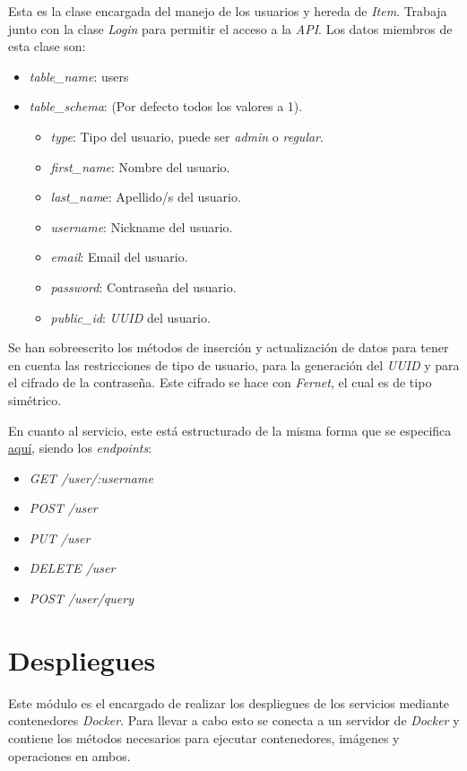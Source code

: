 Esta es la clase encargada del manejo de los usuarios y hereda de \textit{Item}. Trabaja junto con la clase \textit{Login} para permitir el acceso a la \textit{API}. Los datos miembros de esta clase son:
\begin{itemize}
	\item \textit{table\_name}: users
	\item \textit{table\_schema}: (Por defecto todos los valores a 1).
	\begin{itemize}
		\item \textit{type}: Tipo del usuario, puede ser \textit{admin} o \textit{regular}.
		\item \textit{first\_name}: Nombre del usuario.
		\item \textit{last\_nam}e: Apellido/s del usuario.
		\item \textit{username}: Nickname del usuario.
		\item \textit{email}: Email del usuario.
		\item \textit{password}: Contraseña del usuario.
		\item \textit{public\_id}: \textit{UUID} del usuario.
	\end{itemize}
\end{itemize}


\bigskip
Se han sobreescrito los métodos de inserción y actualización de datos para tener en cuenta las restricciones de tipo de usuario, para la generación del \textit{UUID} y para el cifrado de la contraseña. Este cifrado se hace con \textit{Fernet}, el cual es de tipo simétrico.

En cuanto al servicio, este está estructurado de la misma forma que se especifica \hyperref[sec:servicios]{aquí}, siendo los \textit{endpoints}:
\begin{itemize}
	\item \textit{GET /user/:username}
	\item \textit{POST /user}
	\item \textit{PUT /user}
	\item \textit{DELETE /user}
	\item \textit{POST /user/query}
\end{itemize}




\section{Despliegues}

Este módulo es el encargado de realizar los despliegues de los servicios mediante contenedores \textit{Docker}. Para llevar a cabo esto se conecta a un servidor de \textit{Docker} y contiene los métodos necesarios para ejecutar contenedores, imágenes y operaciones en ambos.


